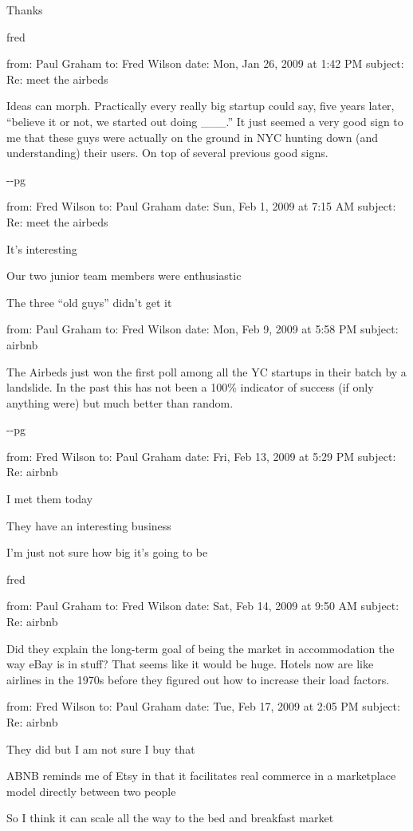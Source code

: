 \documentclass[12pt]{book}
\begin{document}
Thanks

fred

from: Paul Graham to: Fred Wilson date: Mon, Jan 26, 2009 at 1:42 PM
subject: Re: meet the airbeds

Ideas can morph. Practically every really big startup could say, five
years later, ``believe it or not, we started out doing \_\_\_.'' It just
seemed a very good sign to me that these guys were actually on the
ground in NYC hunting down (and understanding) their users. On top of
several previous good signs.

-\/-pg

from: Fred Wilson to: Paul Graham date: Sun, Feb 1, 2009 at 7:15 AM
subject: Re: meet the airbeds

It's interesting

Our two junior team members were enthusiastic

The three ``old guys'' didn't get it

from: Paul Graham to: Fred Wilson date: Mon, Feb 9, 2009 at 5:58 PM
subject: airbnb

The Airbeds just won the first poll among all the YC startups in their
batch by a landslide. In the past this has not been a 100\% indicator of
success (if only anything were) but much better than random.

-\/-pg

from: Fred Wilson to: Paul Graham date: Fri, Feb 13, 2009 at 5:29 PM
subject: Re: airbnb

I met them today

They have an interesting business

I'm just not sure how big it's going to be

fred

from: Paul Graham to: Fred Wilson date: Sat, Feb 14, 2009 at 9:50 AM
subject: Re: airbnb

Did they explain the long-term goal of being the market in accommodation
the way eBay is in stuff? That seems like it would be huge. Hotels now
are like airlines in the 1970s before they figured out how to increase
their load factors.

from: Fred Wilson to: Paul Graham date: Tue, Feb 17, 2009 at 2:05 PM
subject: Re: airbnb

They did but I am not sure I buy that

ABNB reminds me of Etsy in that it facilitates real commerce in a
marketplace model directly between two people

So I think it can scale all the way to the bed and breakfast market
\end{document}
